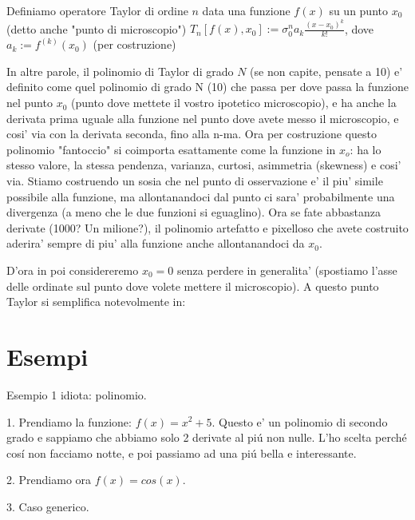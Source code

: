 \begin{definizione}[Taylor] Definiamo operatore Taylor di ordine $n$ data una funzione $f(x)$ su un punto $x_0$ (detto anche "punto di microscopio")
    $T_n[f(x), x_0] := \sigma_0^n a_k \frac{(x-x_0)^k}{k!}$, dove 
    $a_k := f^{(k)}(x_0)$ (per costruzione)
\end{definizione}

In altre parole, il polinomio di Taylor di grado $N$ (se non capite, pensate a 10) e' definito come quel polinomio di grado N (10) che passa
per dove passa la funzione nel punto $x_0$ (punto dove mettete il vostro ipotetico microscopio), e ha anche la derivata prima uguale alla funzione 
nel punto dove avete messo il microscopio, e cosi' via con la derivata seconda, fino alla n-ma. 
Ora per costruzione questo polinomio "fantoccio" si coimporta esattamente come la funzione in $x_o$: ha lo stesso valore, la stessa pendenza, varianza, curtosi, asimmetria (skewness) e cosi' via.
Stiamo costruendo un sosia che nel punto di osservazione e' il piu' simile possibile alla funzione, ma allontanandoci dal punto ci sara' probabilmente una divergenza (a meno che le due funzioni si eguaglino). 
Ora se fate abbastanza derivate (1000? Un milione?), il polinomio artefatto e pixelloso che avete costruito aderira' sempre di piu' alla funzione anche allontanandoci da $x_0$.

D'ora in poi considereremo $x_0 = 0$ senza perdere in generalita' (spostiamo l'asse delle ordinate sul punto dove volete mettere il microscopio). A questo punto Taylor si semplifica notevolmente in:



\section{Esempi}

Esempio 1 idiota: polinomio.

1. Prendiamo la funzione: $f(x) = x^2 + 5$. Questo e' un polinomio di secondo grado e sappiamo che abbiamo solo 2 derivate al pi\'u non nulle.
L'ho scelta perch\'e cos\'i non facciamo notte, e poi passiamo ad una pi\'u bella e interessante.






2. Prendiamo ora $f(x) = cos(x)$.




3. Caso generico.